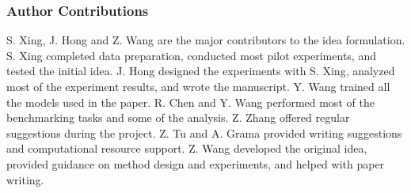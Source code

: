 \documentclass{article} %
\theoremstyle{remark}
\begin{document}

\subsubsection*{Author Contributions}
S. Xing, J. Hong and Z. Wang are the major contributors to the idea formulation.
S. Xing completed data preparation, conducted most pilot experiments, and tested the initial idea.
J. Hong designed the experiments with S. Xing, analyzed most of the experiment results, and wrote the manuscript.
Y. Wang trained all the models used in the paper.
R. Chen and Y. Wang performed most of the benchmarking tasks and some of the analysis.
Z. Zhang offered regular suggestions during the project.
Z. Tu and A. Grama provided writing suggestions and computational resource support.
Z. Wang developed the original idea, provided guidance on method design and experiments, and helped with paper writing.




\newpage
\appendix

% 
% 



% 




\end{document}
